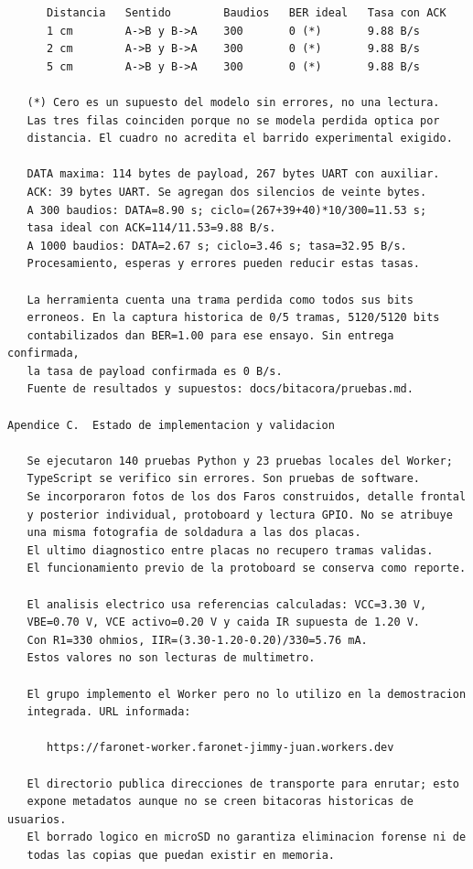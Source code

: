 \newpage
\begin{Verbatim}
      Distancia   Sentido        Baudios   BER ideal   Tasa con ACK
      1 cm        A->B y B->A    300       0 (*)       9.88 B/s
      2 cm        A->B y B->A    300       0 (*)       9.88 B/s
      5 cm        A->B y B->A    300       0 (*)       9.88 B/s

   (*) Cero es un supuesto del modelo sin errores, no una lectura.
   Las tres filas coinciden porque no se modela perdida optica por
   distancia. El cuadro no acredita el barrido experimental exigido.

   DATA maxima: 114 bytes de payload, 267 bytes UART con auxiliar.
   ACK: 39 bytes UART. Se agregan dos silencios de veinte bytes.
   A 300 baudios: DATA=8.90 s; ciclo=(267+39+40)*10/300=11.53 s;
   tasa ideal con ACK=114/11.53=9.88 B/s.
   A 1000 baudios: DATA=2.67 s; ciclo=3.46 s; tasa=32.95 B/s.
   Procesamiento, esperas y errores pueden reducir estas tasas.

   La herramienta cuenta una trama perdida como todos sus bits
   erroneos. En la captura historica de 0/5 tramas, 5120/5120 bits
   contabilizados dan BER=1.00 para ese ensayo. Sin entrega confirmada,
   la tasa de payload confirmada es 0 B/s.
   Fuente de resultados y supuestos: docs/bitacora/pruebas.md.

Apendice C.  Estado de implementacion y validacion

   Se ejecutaron 140 pruebas Python y 23 pruebas locales del Worker;
   TypeScript se verifico sin errores. Son pruebas de software.
   Se incorporaron fotos de los dos Faros construidos, detalle frontal
   y posterior individual, protoboard y lectura GPIO. No se atribuye
   una misma fotografia de soldadura a las dos placas.
   El ultimo diagnostico entre placas no recupero tramas validas.
   El funcionamiento previo de la protoboard se conserva como reporte.

   El analisis electrico usa referencias calculadas: VCC=3.30 V,
   VBE=0.70 V, VCE activo=0.20 V y caida IR supuesta de 1.20 V.
   Con R1=330 ohmios, IIR=(3.30-1.20-0.20)/330=5.76 mA.
   Estos valores no son lecturas de multimetro.

   El grupo implemento el Worker pero no lo utilizo en la demostracion
   integrada. URL informada:

      https://faronet-worker.faronet-jimmy-juan.workers.dev

   El directorio publica direcciones de transporte para enrutar; esto
   expone metadatos aunque no se creen bitacoras historicas de usuarios.
   El borrado logico en microSD no garantiza eliminacion forense ni de
   todas las copias que puedan existir en memoria.
\end{Verbatim}
